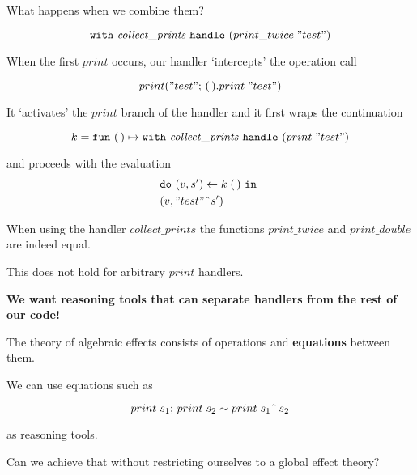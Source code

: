 \documentclass[usenames,dvipsnames]{beamer}
\begin{document}
\begin{frame}

	What happens when we combine them?
	\pause

	\[ \mathtt{with}~{\mathit{collect\_prints}}~\mathtt{handle}~{({print\_twice}\;{"test"})} \]
	\pause

	When the first $print$ occurs, our handler `intercepts' the operation call

	\[ \operation[print]{"test"}{\unit.\apply{print}{"test"}} \]
	\pause

	It `activates' the $print$ branch of the handler and it first wraps the continuation

	\[
		k = \mathtt{fun}~{\mathtt{(\,)}} \mapsto{\mathtt{with}~{\mathit{collect\_prints}}~\mathtt{handle}~{({print}\;{"test"})}}
	\]

	\pause

	and proceeds with the evaluation
	\begin{align*}
		&\mathtt{do}~{(v, s')} \leftarrow{{k}\;{\mathtt{(\,)}}}~\mathtt{in}~\\
		&(v, "test"\;\hat{}\; s')
	\end{align*} 


\end{frame}
\begin{frame}
	When using the handler $\mathit{collect\_prints}$ the functions $print\_twice$ and $print\_double$ are indeed equal.

	\vspace{5mm}

	This does not hold for arbitrary $print$ handlers.

	\pause
	\vspace{5mm}

	\textbf{We want reasoning tools that can separate handlers from the rest of our code!}
\end{frame}
\begin{frame}
	The theory of algebraic effects consists of operations and \textbf{equations} between them.

	\vspace{5mm}

	We can use equations such as

	\[
		{print}\;{s_1};\, {print}\;{s_2} \sim {print}\;{s_1  \;\hat{}\; \, s_2}
	\]

	as reasoning tools.

	\vspace{5mm}

	\pause

	Can we achieve that without restricting ourselves to a global effect theory?

\end{frame}
\end{document}
